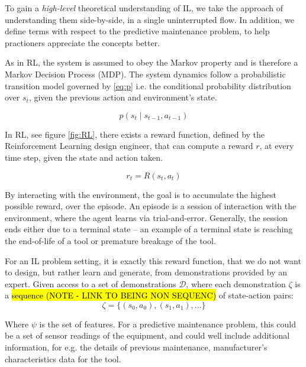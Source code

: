 \documentclass{article}
\newcommand{\hlc}[2][blue!10]{{\colorlet{foo}{#1} \sethlcolor{foo}\hl{#2}}}
\begin{document}
	To gain a \textit{high-level} theoretical understanding of IL, we take the approach of understanding them side-by-side, in a single uninterrupted flow. In addition, we define terms with respect to the predictive maintenance problem, to help practioners appreciate the concepts better. 
	
	As in RL, the system is assumed to obey the Markov property and is therefore a Markov Decision Process (MDP). The system dynamics follow a probabilistic transition model governed by \ref{eq:p} i.e. the conditional probability distribution over $s_t$, given the previous action and environment's state. 
	
	\begin{equation}\label{eq:p}
		p(s_t \mid s_{t-1}, a_{t-1})
	\end{equation}
	
	In RL, see figure \ref{fig:RL}, there exists a reward function, defined by the Reinforcement Learning design engineer, that can compute a reward $r$, at every time step, given the state and action taken.
	
	\begin{equation}\label{eq:R}
		r_t = R(s_t, a_t)
	\end{equation}
	
	By interacting with the environment, the goal is to accumulate the highest possible reward, over the episode. An episode is a session of interaction with the environment, where the agent learns via trial-and-error. Generally, the session ends either due to a terminal state -- an example of a terminal state is reaching the end-of-life of a tool or premature breakage of the tool.
	
	For an IL problem setting, it is exactly this reward function, that we do not want to design, but rather learn and generate, from demonstrations provided by an expert. Given access to a set of demonstrations $\mathcal{D}$, where each demonstration $\zeta$ is a \hlc{sequence (NOTE - LINK TO BEING NON SEQUENC)} of state-action pairs:
	\begin{equation}\label{eq:demo}
		\zeta = \{(s_0, a_0), (s_1, a_1), ...\}
	\end{equation}
	
	
	
	Where $\psi$ is the set of features. For a predictive maintenance problem, this could be a set of sensor readings of the equipment, and could well include additional information, for e.g. the details of previous maintenance, manufacturer's characteristics data for the tool.
	
\end{document}
